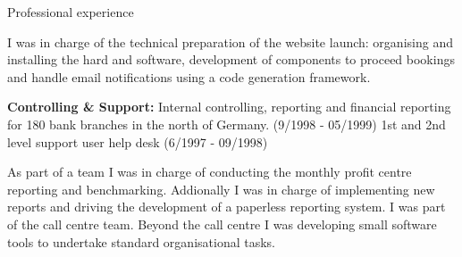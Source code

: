 \begin{rubric}{Professional experience}

I was in charge of the technical preparation of the website launch: organising and installing the hard and software, development of components to proceed bookings and handle email notifications using a code generation framework.

\entry*[06/1997 - 05/1999] \textbf{Controlling \& Support:}\newline
{} 
Internal controlling, reporting and financial reporting for 180 bank branches in the north of Germany. (9/1998 - 05/1999)
1st and 2nd level support user help desk (6/1997 - 09/1998)

As part of a team I was in charge of conducting the monthly profit centre reporting and benchmarking. Addionally I was in charge of implementing new reports and driving the development of a paperless reporting system. 
I was part of the call centre team. Beyond the call centre I was developing small software tools to undertake standard organisational tasks. 

\sloppy
\end{rubric}
